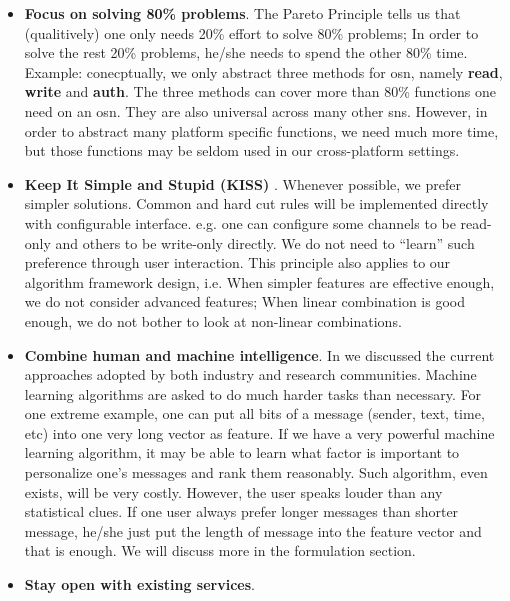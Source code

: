 \documentclass{sig-alternate}
\begin{document}
\begin{itemize}
	\item \textbf{Focus on solving 80\% problems}. 
		The Pareto Principle \cite{wiki_pareto} tells us that 
		(qualitively) one only needs 20\% effort to solve 80\% problems; 
		In order to solve the rest 20\% problems, he/she needs to 
		spend the other 80\% time. 
		Example: conecptually, we only abstract three methods for \gls{osn}, 
		namely \textbf{read}, \textbf{write} and \textbf{auth}. 
		The three methods can cover more than 80\% functions one need on an \gls{osn}. 
		They are also universal across many other \gls{sns}. 
		However, in order to abstract many platform specific functions, 
		we need much more time, but those functions may be seldom used 
		in our cross-platform settings. 
	\item \textbf{Keep It Simple and Stupid (KISS)} \cite{wiki_kiss}. 
		Whenever possible, we prefer simpler solutions. 
		Common and hard cut rules will be implemented directly with configurable interface. 
		e.g. one can configure some channels to be read-only and others to be write-only directly. 
		We do not need to ``learn'' such preference through user interaction. 
		This principle also applies to our algorithm framework design, 
		i.e. When simpler features are effective enough, we do not consider advanced features;
		When linear combination is good enough, we do not bother to look at non-linear combinations. 
	\item \textbf{Combine human and machine intelligence}. 
		In \rsec{\ref{sec:Related Work}} we discussed the current approaches adopted by 
		both industry and research communities. 
		Machine learning algorithms are asked to do much harder tasks than necessary. 
		For one extreme example, one can put all bits of a message 
		(sender, text, time, etc) into one very long vector as feature. 
		If we have a very powerful machine learning algorithm, it may be able to 
		learn what factor is important to personalize one's messages and rank them reasonably. 
		Such algorithm, even exists, will be very costly. 
		However, the user speaks louder than any statistical clues.  
		If one user always prefer longer messages than shorter message, 
		he/she just put the length of message into the feature vector and that is enough. 
		We will discuss more in the formulation section. 
	\item \textbf{Stay open with existing services}. 

\end{itemize}
\end{document}
